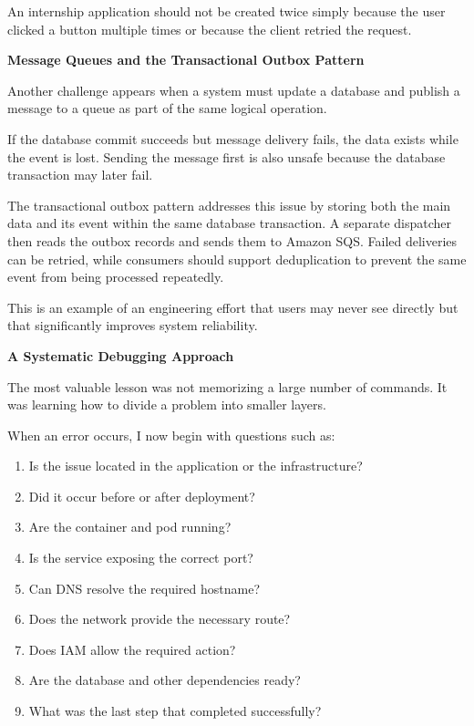 An internship application should not be created twice simply because the
user clicked a button multiple times or because the client retried the
request.

\vspace{0.5em}\noindent\textbf{Message Queues and the Transactional Outbox
Pattern}\par

Another challenge appears when a system must update a database and
publish a message to a queue as part of the same logical operation.

If the database commit succeeds but message delivery fails, the data
exists while the event is lost. Sending the message first is also unsafe
because the database transaction may later fail.

The transactional outbox pattern addresses this issue by storing both
the main data and its event within the same database transaction. A
separate dispatcher then reads the outbox records and sends them to
Amazon SQS. Failed deliveries can be retried, while consumers should
support deduplication to prevent the same event from being processed
repeatedly.

This is an example of an engineering effort that users may never see
directly but that significantly improves system reliability.

\vspace{0.5em}\noindent\textbf{A Systematic Debugging
Approach}\par

The most valuable lesson was not memorizing a large number of commands.
It was learning how to divide a problem into smaller layers.

When an error occurs, I now begin with questions such as:

\begin{enumerate}
\def\labelenumi{\arabic{enumi}.}
\tightlist
\item
  Is the issue located in the application or the infrastructure?
\item
  Did it occur before or after deployment?
\item
  Are the container and pod running?
\item
  Is the service exposing the correct port?
\item
  Can DNS resolve the required hostname?
\item
  Does the network provide the necessary route?
\item
  Does IAM allow the required action?
\item
  Are the database and other dependencies ready?
\item
  What was the last step that completed successfully?
\end{enumerate}

